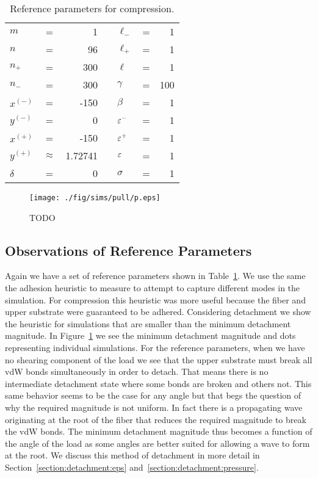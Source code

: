 	\begin{table}
		\centering
		\caption{Reference parameters for compression. \label{table:detachment_reference}}
		\begin{tabular}{lcrclcr}
			$m$ & = & 1 & \hspace{1in} & $\ell_-$ & = & 1 \\
			$n$ & = & 96 & & $\ell_+$ & = & 1 \\
			$n_+$ & = & 300 & & $\ell$ & = & 1 \\
			$n_-$ & = & 300 & & $\gamma$ & = & 100 \\
			$x^{(-)}$ & = & -150 & & $\beta$ & = & 1 \\
			$y^{(-)}$ & = & 0 & & $\varepsilon^-$ & = & 1 \\
			$x^{(+)}$ & = & -150 & & $\varepsilon^+$ & = & 1 \\
			$y^{(+)}$ & $\approx$ & 1.72741 & & $\varepsilon$ & = & 1 \\
			$\delta$ & = & 0 & & $\sigma$ & = & 1
		\end{tabular}
	\end{table}
	
	\begin{figure}
		\begin{center}
			\texttt{[image: ./fig/sims/pull/p.eps]}
		\end{center}		
		\caption{ TODO
		\label{fig:PullGrid}}
	\end{figure}

\subsection{Observations of Reference Parameters}

Again we have a set of reference parameters shown in Table~\ref{table:detachment_reference}. We use the same the adhesion heuristic to measure to attempt to capture different modes in the simulation. For compression this heuristic was more useful because the fiber and upper substrate were guaranteed to be adhered. Considering detachment we show the heuristic for simulations that are smaller than the minimum detachment magnitude. In Figure~\ref{fig:PullGrid} we see the minimum detachment magnitude and dots representing individual simulations. For the reference parameters, when we have no shearing component of the load we see that the upper substrate must break all vdW bonds simultaneously in order to detach. That means there is no intermediate detachment state where some bonds are broken and others not. This same behavior seems to be the case for any angle but that begs the question of why the required magnitude is not uniform. In fact there is a propagating wave originating at the root of the fiber that reduces the required magnitude to break the vdW bonds. The minimum detachment magnitude thus becomes a function of the angle of the load as some angles are better suited for allowing a wave to form at the root. We discuss this method of detachment in more detail in Section~\ref{section:detachment:eps} and~\ref{section:detachment:pressure}.


